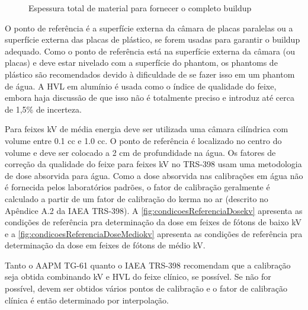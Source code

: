 \documentclass[11pt,a4paper]{article}
\begin{document}
	\begin{figure}[h]
		\centering
		\caption{Espessura total de material para fornecer o completo buildup}
		\label{fig:kvEspessuraBuildup}
	\end{figure}
	
	O ponto de referência é a superfície externa da câmara de placas paralelas ou a superfície externa das placas de plástico, se forem usadas para garantir o buildup adequado. Como o ponto de referência está na superfície externa da câmara (ou placas) e deve estar nivelado com a superfície do phantom, os phantoms de plástico são recomendados devido à dificuldade de se fazer isso em um phantom de água. A HVL em alumínio é usada como o índice de qualidade do feixe, embora haja discussão de que isso não é totalmente preciso e introduz até cerca de 1,5\% de incerteza.
	
	Para feixes kV de média energia deve ser utilizada uma câmara cilíndrica com volume entre 0.1 cc e 1.0 cc. O ponto de referência é localizado no centro do volume e deve ser colocado a 2 cm de profundidade na água. Os fatores de correção da qualidade do feixe para feixes kV no TRS-398 usam uma metodologia de dose absorvida para água. Como a dose absorvida nas calibrações em água não é fornecida pelos laboratórios padrões, o fator de calibração geralmente é calculado a partir de um fator de calibração do kerma no ar (descrito no Apêndice A.2 da IAEA TRS-398). A \ref{fig:condicoesReferenciaDosekv} apresenta as condições de referência pra determinação da dose em feixes de fótons de baixo kV e a \ref{fig:condicoesReferenciaDoseMediokv} apresenta as condições de referência pra determinação da dose em feixes de fótons de médio kV.

	Tanto o AAPM TG-61 quanto o IAEA TRS-398 recomendam que a calibração seja obtida combinando kV e HVL do feixe clínico, se possível. Se não for possível, devem ser obtidos vários pontos de calibração e o fator de calibração clínica é então determinado por interpolação.
\end{document}
